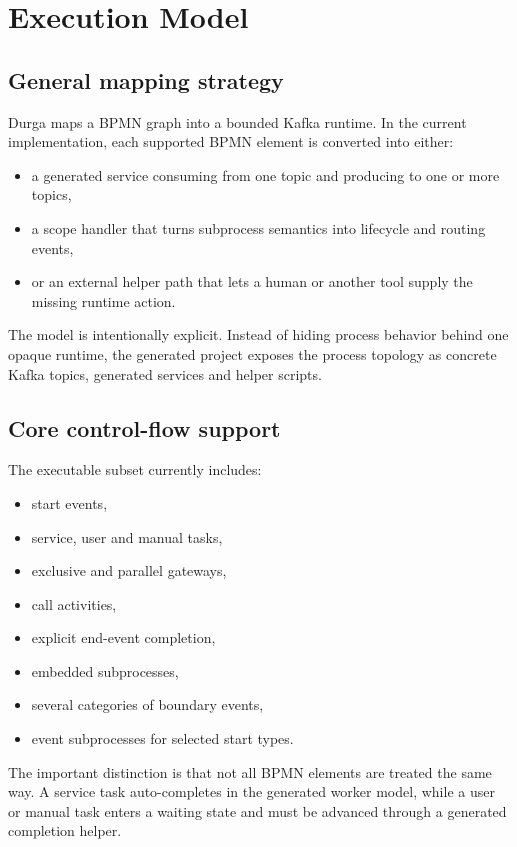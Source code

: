 \section{Execution Model}
\label{sec:ExecutionModel}

\subsection{General mapping strategy}

Durga maps a BPMN graph into a bounded Kafka runtime. In the current implementation, each supported BPMN element is converted into either:
\begin{itemize}
\item a generated service consuming from one topic and producing to one or more topics,
\item a scope handler that turns subprocess semantics into lifecycle and routing events,
\item or an external helper path that lets a human or another tool supply the missing runtime action.
\end{itemize}

The model is intentionally explicit. Instead of hiding process behavior behind one opaque runtime, the generated project exposes the process topology as concrete Kafka topics, generated services and helper scripts.

\subsection{Core control-flow support}

The executable subset currently includes:
\begin{itemize}
\item start events,
\item service, user and manual tasks,
\item exclusive and parallel gateways,
\item call activities,
\item explicit end-event completion,
\item embedded subprocesses,
\item several categories of boundary events,
\item event subprocesses for selected start types.
\end{itemize}

The important distinction is that not all BPMN elements are treated the same way. A service task auto-completes in the generated worker model, while a user or manual task enters a waiting state and must be advanced through a generated completion helper.

